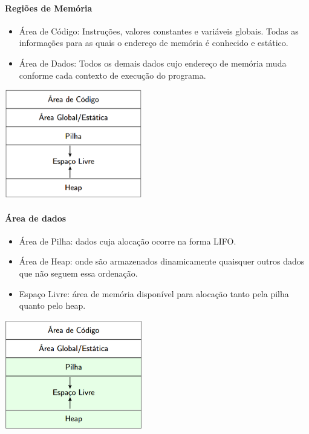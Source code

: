 \documentclass{beamer}
\newcommand{\slide}[2]{
	\begin{frame}{\insertsection}
		\framesubtitle{#1}
		#2
	\end{frame}
}
\begin{document}
\slide{Regiões de Memória}{

	\begin{itemize}
		\item Área de Código: Instruções, valores constantes e variáveis globais. Todas as informações para as quais o endereço de memória é conhecido e estático.
		      \pause
		\item Área de Dados: Todos os demais dados cujo endereço de memória muda conforme cada contexto de execução do programa.
	\end{itemize}

	\vspace{0.5cm}

	\centering
	\includegraphics[width=0.45\textwidth]{images/memoria_pilha.png}
}

\slide{Área de dados}{

	\begin{itemize}
		\item Área de Pilha: dados cuja alocação ocorre na forma LIFO.
		\item Área de Heap: onde são armazenados dinamicamente quaisquer outros dados que não seguem essa ordenação.
		\item Espaço Livre: área de memória disponível para alocação tanto pela pilha quanto pelo heap.
	\end{itemize}

	\vspace{0.5cm}

	\centering
	\includegraphics[width=0.45\textwidth]{images/memoria_verde.png}
}
\end{document}
